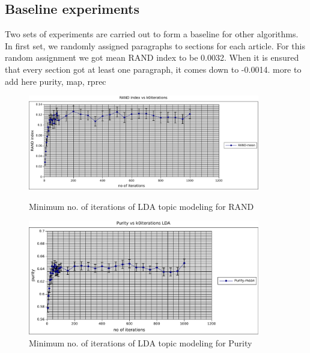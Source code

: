 \subsection{Baseline experiments} Two sets of experiments are carried out to form a baseline for other algorithms. In first set, we randomly assigned paragraphs to sections for each article. For this random assignment we got mean RAND index to be 0.0032. When it is ensured that every section got at least one paragraph, it comes down to -0.0014. more to add here purity, map, rprec
\begin{figure}
    \centering
    \begin{minipage}{0.45\textwidth}
        \centering
        \includegraphics[width=0.9\textwidth]{rand_k0iter_lda.pdf}
        \caption{Minimum no. of iterations of LDA topic modeling for RAND}
    \end{minipage}\hfill
    \begin{minipage}{0.45\textwidth}
        \centering
        \includegraphics[width=0.9\textwidth]{purity_k0iter_lda.pdf}
        \caption{Minimum no. of iterations of LDA topic modeling for Purity}
    \end{minipage}
\end{figure}
